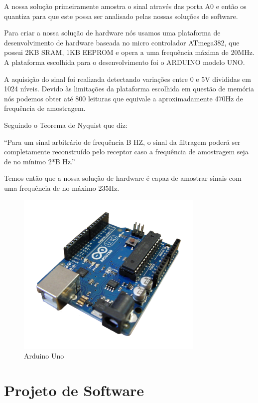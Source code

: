 \documentclass[12pt,a4paper]{report}
\begin{document}
A nossa solução primeiramente amostra o sinal através das porta A0 e então os quantiza para que este possa ser analisado pelas nossas soluções de software.

Para criar a nossa solução de hardware nós usamos uma plataforma de desenvolvimento de hardware baseada no micro controlador ATmega382, que possui 2KB SRAM, 1KB EEPROM e opera a uma frequência máxima de 20MHz. A plataforma escolhida para o desenvolvimento foi o ARDUINO modelo UNO.

A aquisição do sinal foi realizada detectando variações entre 0 e 5V divididas em 1024 níveis. Devido às limitações da plataforma escolhida em questão de memória nós podemos obter até 800 leituras que equivale a aproximadamente 470Hz de frequência de amostragem.

Seguindo o Teorema de Nyquist que diz:

“Para um sinal arbitrário de frequência B HZ, o sinal da filtragem poderá ser completamente reconstruído pelo receptor caso a frequência de amostragem seja de no mínimo 2*B Hz.”

Temos então que a nossa solução de hardware é capaz de amostrar sinais com uma frequência de no máximo 235Hz.

\begin{figure}[p]
\includegraphics[width=0.8\textwidth]{arduino.png}
\caption{Arduino Uno}
\label{fig:arduino}
\end{figure}

\chapter{Projeto de Software}
\end{document}
